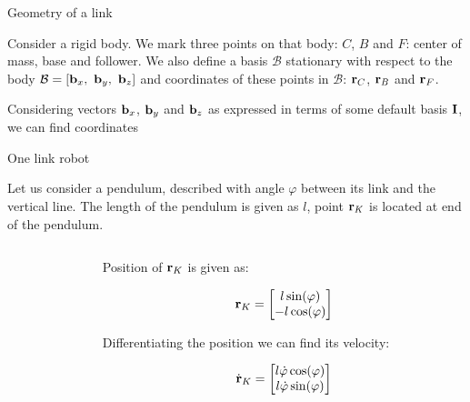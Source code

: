 \documentclass{beamer}
\begin{document}
\begin{frame}{Geometry of a link}
	\begin{flushleft}
		
		
		Consider a rigid body. We mark three points on that body: $C$, $B$ and $F$: center of mass, base and follower. We also define a basis $\mathcal{B}$ stationary with respect to the body $\mathcal{B} = [\bo{b}_x, \ \bo{b}_y, \ \bo{b}_z]$ and coordinates of these points in $\mathcal{B}$: $\mathbf{r}_C$, $\mathbf{r}_B$ and $\mathbf{r}_F$.
		
		\bigskip
		
		Considering vectors $\mathbf{b}_x$, $\mathbf{b}_y$ and $\mathbf{b}_z$ as expressed in terms of some default basis $\mathbf{I}$, we can find coordinates 
		
		
		
	\end{flushleft}
\end{frame}



\begin{frame}{One link robot}
	\begin{flushleft}
		
		Let us consider a pendulum, described with angle $\varphi$ between its link and the vertical line. The length of the pendulum is given as $l$, point $\mathbf{r}_K$ is located at end of the pendulum.
		
		\bigskip
		
		\begin{columns}
			\begin{column}{0.5\textwidth}
				
			\end{column}
			\begin{column}{0.5\textwidth}  %
				
				Position of $\mathbf{r}_K$ is given as:
				
				\begin{equation}
					\mathbf{r}_K = \begin{bmatrix}
						l \sin (\varphi) \\ 
						-l \cos (\varphi) 
					\end{bmatrix}
				\end{equation}
				
				Differentiating the position we can find its velocity:
				
				\begin{equation}
					\dot{\mathbf{r}}_K = \begin{bmatrix}
						 l \dot \varphi \cos (\varphi) \\ 
						 l \dot \varphi \sin (\varphi) 
					\end{bmatrix}
				\end{equation}
				
				
			\end{column}
		\end{columns}
		
		
	\end{flushleft}
\end{frame}
\end{document}
